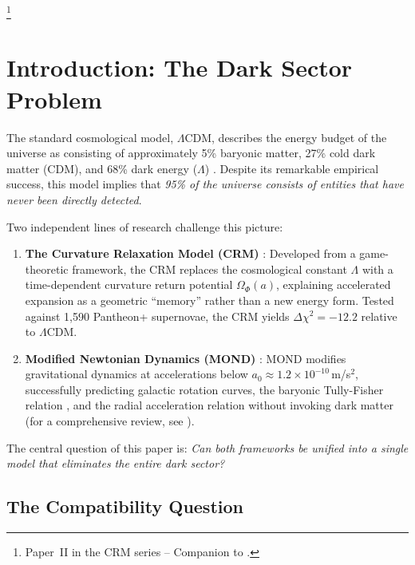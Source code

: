 \documentclass[aps,prd,twocolumn,superscriptaddress,nofootinbib]{revtex4-2}
\begin{document}
\thanks{Paper~II in the CRM series -- Companion to \cite{Geiger2026}.}

\maketitle


\section{Introduction: The Dark Sector Problem}
\label{sec:intro}

The standard cosmological model, $\Lambda$CDM, describes the energy budget of the universe as consisting of approximately 5\% baryonic matter, 27\% cold dark matter (CDM), and 68\% dark energy ($\Lambda$) \cite{Planck2020}. Despite its remarkable empirical success, this model implies that \textit{95\% of the universe consists of entities that have never been directly detected}.

Two independent lines of research challenge this picture:

\begin{enumerate}
\item \textbf{The Curvature Relaxation Model (CRM)} \cite{Geiger2026}: Developed from a game-theoretic framework, the CRM replaces the cosmological constant $\Lambda$ with a time-dependent curvature return potential $\Omega_\Phi(a)$, explaining accelerated expansion as a geometric ``memory'' rather than a new energy form. Tested against 1,590 Pantheon+ supernovae, the CRM yields $\Delta\chi^2 = -12.2$ relative to $\Lambda$CDM.

\item \textbf{Modified Newtonian Dynamics (MOND)} \cite{Milgrom1983}: MOND modifies gravitational dynamics at accelerations below $a_0 \approx 1.2 \times 10^{-10}$\,m/s$^2$, successfully predicting galactic rotation curves, the baryonic Tully-Fisher relation \cite{McGaugh2016}, and the radial acceleration relation \cite{Lelli2017} without invoking dark matter (for a comprehensive review, see \cite{FamaeyMcGaugh2012}).
\end{enumerate}

The central question of this paper is: \textit{Can both frameworks be unified into a single model that eliminates the entire dark sector?}

\subsection{The Compatibility Question}
\end{document}
